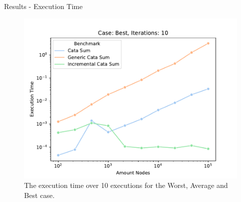 \begin{slide}{Results - Execution Time}
\begin{figure}[H]
\begin{minipage}{.32\textwidth}
      \includegraphics[width=\textwidth]{images/time/Best/10/all_benchmarks.pdf}  
    \end{minipage}
    \caption{The execution time over 10 executions for the Worst, Average and Best case.}
    \label{fig-exec-time-no-policy}
  \end{figure}
\end{slide}

